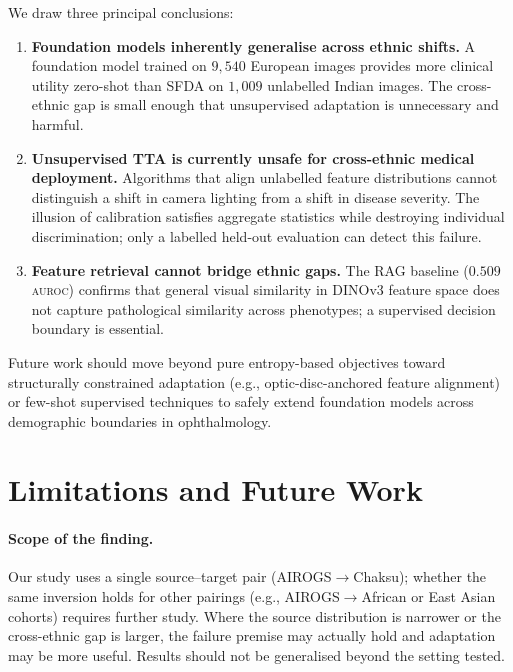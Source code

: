 \documentclass[11pt]{article}
\newcommand{\src}{AIROGS}
\newcommand{\auroc}{\textsc{auroc}}
\begin{document}
We draw three principal conclusions:
\begin{enumerate}[leftmargin=1.2em,topsep=2pt,itemsep=1pt]
  \item \textbf{Foundation models inherently generalise across ethnic shifts.} A foundation model trained on $9{,}540$ European images
    provides more clinical utility zero-shot than SFDA on $1{,}009$
    unlabelled Indian images. The cross-ethnic gap is small enough that
    unsupervised adaptation is unnecessary and harmful.
  \item \textbf{Unsupervised TTA is currently unsafe for cross-ethnic
    medical deployment.} Algorithms that align unlabelled feature
    distributions cannot distinguish a shift in camera lighting from a
    shift in disease severity. The illusion of calibration satisfies
    aggregate statistics while destroying individual discrimination;
    only a labelled held-out evaluation can detect this failure.
  \item \textbf{Feature retrieval cannot bridge ethnic gaps.} The RAG
    baseline ($0.509$ \auroc{}) confirms that general visual similarity
    in DINOv3 feature space does not capture pathological similarity
    across phenotypes; a supervised decision boundary is essential.
\end{enumerate}
Future work should move beyond pure entropy-based objectives toward
structurally constrained adaptation (e.g., optic-disc-anchored feature
alignment) or few-shot supervised techniques to safely extend foundation
models across demographic boundaries in ophthalmology.

\section{Limitations and Future Work}
\label{sec:futurelimitations}

\paragraph{Scope of the finding.}
Our study uses a single source--target pair (\src{}$\to$Chaksu); whether
the same inversion holds for other pairings (e.g., AIROGS$\to$African or
East Asian cohorts) requires further study. Where the source distribution
is narrower or the cross-ethnic gap is larger, the failure premise may
actually hold and adaptation may be more useful. Results should not be
generalised beyond the setting tested.
\end{document}
